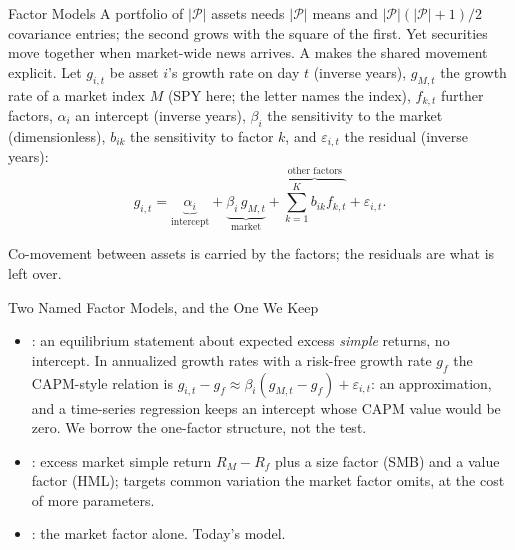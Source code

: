 \documentclass[aspectratio=169,11pt]{beamer}
\newcommand{\np}{|\mathcal P|}
\begin{document}
\begin{frame}{Factor Models}
  A portfolio of $\np$ assets needs $\np$ means and $\np(\np+1)/2$ covariance
  entries; the second grows with the square of the first. Yet securities move
  together when market-wide news arrives. A  makes the
  shared movement explicit. Let $g_{i,t}$ be asset $i$'s growth rate on day $t$
  (inverse years), $g_{M,t}$ the growth rate of a market index $M$ (SPY here;
  the letter names the index), $f_{k,t}$ further factors, $\alpha_i$ an intercept
  (inverse years), $\beta_i$ the sensitivity to the market (dimensionless),
  $b_{ik}$ the sensitivity to factor $k$, and $\varepsilon_{i,t}$ the
  residual (inverse years):
  \[
    g_{i,t}=\underbrace{\alpha_i}_{\text{intercept}}
      +\underbrace{\beta_i\,g_{M,t}}_{\text{market}}
      +\overbrace{\textstyle\sum_{k=1}^{K}b_{ik}f_{k,t}}^{\text{other factors}}
      +\varepsilon_{i,t}.
  \]

  \vspace{0.2em}
  Co-movement between assets is carried by the factors; the residuals are what is
  left over.
\end{frame}

\begin{frame}{Two Named Factor Models, and the One We Keep}
  \begin{itemize}\setlength{\itemsep}{0.55em}
    \item {}: an equilibrium statement about
      expected excess \emph{simple} returns, no intercept. In annualized growth
      rates with a risk-free growth rate $g_f$ the CAPM-style relation is
      $g_{i,t}-g_f\approx\beta_i(g_{M,t}-g_f)+\varepsilon_{i,t}$: an
      approximation, and a time-series regression keeps an intercept whose CAPM
      value would be zero. We borrow the one-factor structure, not the test.
    \item {}: excess market simple return $R_M-R_f$ plus a
      size factor (SMB) and a value factor (HML); targets common variation the
      market factor omits, at the cost of more parameters.
    \item {}: the market factor alone. Today's model.
  \end{itemize}
\end{frame}
\end{document}
